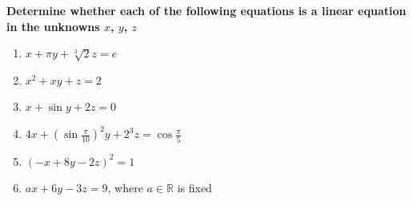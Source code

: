 
\item \textbf{Determine whether each of the
following equations is a linear equation
in the unknowns $x$, $y$, $z$}

\begin{enumerate}[label=\alph*)]

    \item
    $x+\pi y+\sqrt[3]{2}z=e$

    \begin{answer}
    \end{answer}

    \item
    $x^2+xy+z=2$

    \begin{answer}
    \end{answer}

    \item
    $x+\sin y+2z=0$

    \begin{answer}
    \end{answer}

    \item
    $4x+\left(\sin\frac{\pi}{10}\right)^2y
    +2^3z=\cos\frac{\pi}{5}$

    \begin{answer}
    \end{answer}

    \item
    $(-x+8y-2z)^2=1$

    \begin{answer}
    \end{answer}

    \item
    $ax+6y-3z=9$,
    where $a\in\mathbb{R}$ is fixed

    \begin{answer}
    \end{answer}

\end{enumerate}
